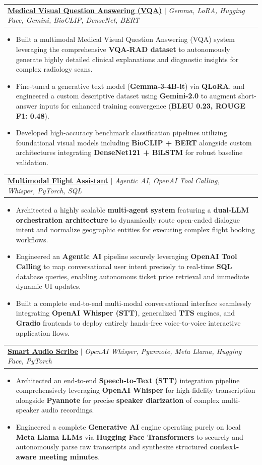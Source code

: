 \documentclass[letterpaper,11pt]{article}
\makeatletter
\newcommand{\resumeItem}[1]{
  \item\small{
    {#1 \vspace{-2pt}}
  }
}
\newcommand{\resumeProjectHeading}[2]{
  \vspace{-2pt}\item
    \begin{tabular*}{1.0\textwidth}[t]{l@{\extracolsep{\fill}}r}
      #1 & \textbf{\small #2} \\
    \end{tabular*}\vspace{-7pt}
}
\newcommand{\resumeItemListStart}{\begin{itemize}}
\newcommand{\resumeItemListEnd}{\end{itemize}\vspace{-5pt}}
\makeatother
\begin{document}
    \resumeProjectHeading
          {\textbf{\href{https://github.com/mutyaladevi17/visual-question-answer}{Medical Visual Question Answering (VQA)}} $|$ \emph{Gemma, LoRA, Hugging Face, Gemini, BioCLIP, DenseNet, BERT}}{}
          \resumeItemListStart
            \resumeItem{Built a multimodal Medical Visual Question Answering (VQA) system leveraging the comprehensive \textbf{VQA-RAD dataset} to autonomously generate highly detailed clinical explanations and diagnostic insights for complex radiology scans.}
            \resumeItem{Fine-tuned a generative text model (\textbf{Gemma-3-4B-it}) via \textbf{QLoRA}, and engineered a custom descriptive dataset using \textbf{Gemini-2.0} to augment short-answer inputs for enhanced training convergence (\textbf{BLEU 0.23, ROUGE F1: 0.48}).}
            \resumeItem{Developed high-accuracy benchmark classification pipelines utilizing foundational visual models including \textbf{BioCLIP + BERT} alongside custom architectures integrating \textbf{DenseNet121 + BiLSTM} for robust baseline validation.}
          \resumeItemListEnd

      \resumeProjectHeading
          {\textbf{\href{https://github.com/mutyaladevi17/multimodal-flight-assistant}{Multimodal Flight Assistant}} $|$ \emph{Agentic AI, OpenAI Tool Calling, Whisper, PyTorch, SQL}}{}
          \resumeItemListStart
            \resumeItem{Architected a highly scalable \textbf{multi-agent system} featuring a \textbf{dual-LLM orchestration architecture} to dynamically route open-ended dialogue intent and normalize geographic entities for executing complex flight booking workflows.}
            \resumeItem{Engineered an \textbf{Agentic AI} pipeline securely leveraging \textbf{OpenAI Tool Calling} to map conversational user intent precisely to real-time \textbf{SQL} database queries, enabling autonomous ticket price retrieval and immediate dynamic UI updates.}
            \resumeItem{Built a complete end-to-end multi-modal conversational interface seamlessly integrating \textbf{OpenAI Whisper (STT)}, generalized \textbf{TTS} engines, and \textbf{Gradio} frontends to deploy entirely hands-free voice-to-voice interactive application flows.}
          \resumeItemListEnd

      \resumeProjectHeading
          {\textbf{\href{https://github.com/mutyaladevi17/smart-audio-scribe}{Smart Audio Scribe}} $|$ \emph{OpenAI Whisper, Pyannote, Meta Llama, Hugging Face, PyTorch}}{}
          \resumeItemListStart
            \resumeItem{Architected an end-to-end \textbf{Speech-to-Text (STT)} integration pipeline comprehensively leveraging \textbf{OpenAI Whisper} for high-fidelity transcription alongside \textbf{Pyannote} for precise \textbf{speaker diarization} of complex multi-speaker audio recordings.}
            \resumeItem{Engineered a complete \textbf{Generative AI} engine operating purely on local \textbf{Meta Llama LLMs} via \textbf{Hugging Face Transformers} to securely and autonomously parse raw transcripts and synthesize structured \textbf{context-aware meeting minutes}.}
          \resumeItemListEnd
\end{document}
